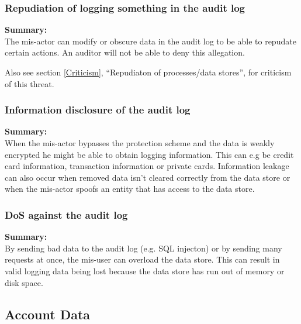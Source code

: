 \documentclass[a4paper,11pt]{report}
\begin{document}
\subsubsection{Repudiation of logging something in the audit log}
\label{AuditLogCasesR}
\textbf{Summary:} \\
The mis-actor can modify or obscure data in the audit log to be able to
repudate certain actions. An auditor will not be able to deny this
allegation.

Also see section \ref{Criticism}, ``Repudiaton of processes/data stores'', for criticism of this threat.

\subsubsection{Information disclosure of the audit log}
\label{AuditLogCasesI}
\textbf{Summary:} \\
When the mis-actor bypasses the protection scheme and the data is weakly encrypted he might be able to obtain logging information. This can e.g be credit card information, transaction information or private cards. Information leakage can also occur when removed data isn't cleared correctly from the data store or when the mis-actor spoofs an entity that has access to the data store.

\subsubsection{DoS against the audit log}
\label{AuditLogCasesD}
\textbf{Summary:} \\
By sending bad data to the audit log (e.g. SQL injecton) or by sending many requests at once, the mis-user can overload the data store. This can result in valid logging data being lost because the data store has run out of memory or disk space.

\subsection{Account Data}
\label{AccountDataCases}
\end{document}
